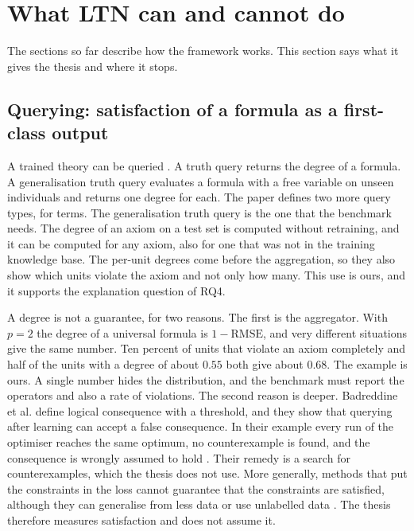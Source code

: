 \section{What LTN can and cannot do}
\label{sec:ltn-capabilities}

The sections so far describe how the framework works. This section says what it
gives the thesis and where it stops.

\subsection{Querying: satisfaction of a formula as a first-class output}
\label{sec:querying}

A trained theory can be queried \citep{badreddine2022ltn}. A truth query
returns the degree of a formula. A generalisation truth query evaluates a
formula with a free variable on unseen individuals and returns one degree for
each. The paper defines two more query types, for terms. The generalisation truth
query is the one that the benchmark needs. The degree of an axiom on a test set is computed
without retraining, and it can be computed for any axiom, also for one that was
not in the training knowledge base. The per-unit degrees come before the
aggregation, so they also show which units violate the axiom and not only how
many. This use is ours, and it supports the explanation question of RQ4.

A degree is not a guarantee, for two reasons. The first is the aggregator.
With $p=2$ the degree of a universal formula is $1-\mathrm{RMSE}$, and very
different situations give the same number. Ten percent of units that violate
an axiom completely and half of the units with a degree of about $0.55$ both
give about $0.68$. The example is ours. A single number hides the distribution,
and the benchmark must report the operators and also a rate of violations.
The second reason is deeper. Badreddine et al. define logical consequence with
a threshold, and they show that querying after learning can accept a false
consequence. In their example every run of the optimiser reaches the same
optimum, no counterexample is found, and the consequence is wrongly assumed to
hold \citep{badreddine2022ltn}. Their remedy is a search for counterexamples,
which the thesis does not use. More generally, methods that put the constraints
in the loss cannot guarantee that the constraints are satisfied, although they
can generalise from less data or use unlabelled data \citep{giunchiglia2022deep}.
The thesis therefore measures satisfaction and does not assume it.

